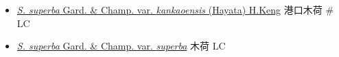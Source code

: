 \begin{itemize}
  \begin{itemize}
        \item[] \href{http://www.theplantlist.org/tpl1.1/search?q=Schima+superba+var.+kankaoensis}{\textit{S. superba} Gard. \& Champ. var. \textit{kankaoensis} (Hayata) H.Keng}   港口木荷  \# LC
        \item[] \href{http://www.theplantlist.org/tpl1.1/search?q=Schima+superba+var.+superba}{\textit{S. superba} Gard. \& Champ. var. \textit{superba}}   木荷   LC
  \end{itemize}
  \end{itemize}
